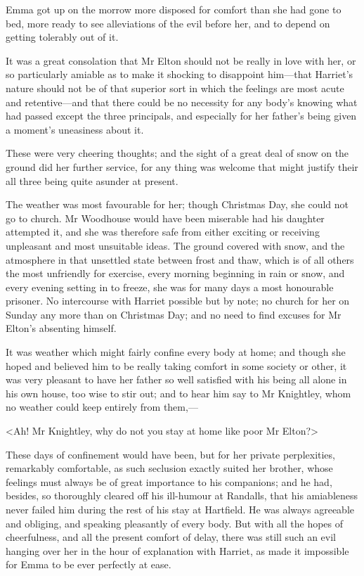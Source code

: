 Emma got up on the morrow more disposed for comfort than she had gone to bed, more ready to see alleviations of the evil before her, and to depend on getting tolerably out of it.

It was a great consolation that Mr Elton should not be really in love with her, or so particularly amiable as to make it shocking to disappoint him—that Harriet's nature should not be of that superior sort in which the feelings are most acute and retentive—and that there could be no necessity for any body's knowing what had passed except the three principals, and especially for her father's being given a moment's uneasiness about it.

These were very cheering thoughts; and the sight of a great deal of snow on the ground did her further service, for any thing was welcome that might justify their all three being quite asunder at present.

The weather was most favourable for her; though Christmas Day, she could not go to church. Mr Woodhouse would have been miserable had his daughter attempted it, and she was therefore safe from either exciting or receiving unpleasant and most unsuitable ideas. The ground covered with snow, and the atmosphere in that unsettled state between frost and thaw, which is of all others the most unfriendly for exercise, every morning beginning in rain or snow, and every evening setting in to freeze, she was for many days a most honourable prisoner. No intercourse with Harriet possible but by note; no church for her on Sunday any more than on Christmas Day; and no need to find excuses for Mr Elton's absenting himself.

It was weather which might fairly confine every body at home; and though she hoped and believed him to be really taking comfort in some society or other, it was very pleasant to have her father so well satisfied with his being all alone in his own house, too wise to stir out; and to hear him say to Mr Knightley, whom no weather could keep entirely from them,—

<Ah! Mr Knightley, why do not you stay at home like poor Mr Elton?>

These days of confinement would have been, but for her private perplexities, remarkably comfortable, as such seclusion exactly suited her brother, whose feelings must always be of great importance to his companions; and he had, besides, so thoroughly cleared off his ill-humour at Randalls, that his amiableness never failed him during the rest of his stay at Hartfield. He was always agreeable and obliging, and speaking pleasantly of every body. But with all the hopes of cheerfulness, and all the present comfort of delay, there was still such an evil hanging over her in the hour of explanation with Harriet, as made it impossible for Emma to be ever perfectly at ease.